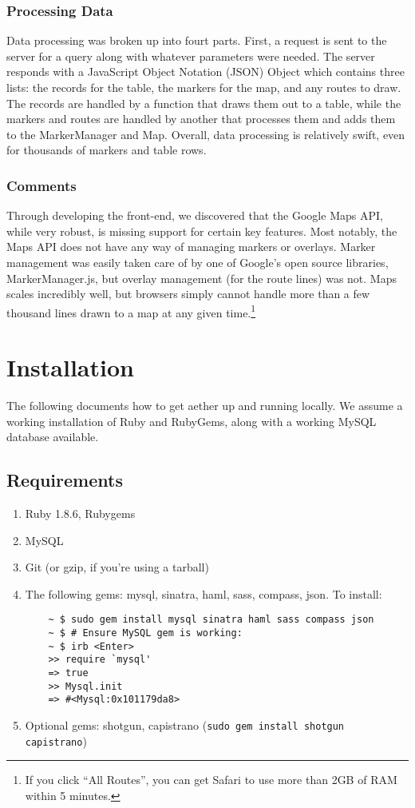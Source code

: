 \subsubsection{Processing Data}
Data processing was broken up into fourt parts. First, a request is sent to the server for a query along with whatever parameters were needed. The server responds with a JavaScript Object Notation (JSON) Object which contains three lists: the records for the table, the markers for the map, and any routes to draw. The records are handled by a function that draws them out to a table, while the markers and routes are handled by another that processes them and adds them to the MarkerManager and Map. Overall, data processing is relatively swift, even for thousands of markers and table rows.

\subsubsection{Comments}
Through developing the front-end, we discovered that the Google Maps API, while very robust, is missing support for certain key features. Most notably, the Maps API does not have any way of managing markers or overlays. Marker management was easily taken care of by one of Google's open source libraries, MarkerManager.js, but overlay management (for the route lines) was not. Maps scales incredibly well, but browsers simply cannot handle more than a few thousand lines drawn to a map at any given time.\footnote{If you click ``All Routes'', you can get Safari to use more than 2GB of RAM within 5 minutes.}

\section{Installation}
The following documents how to get aether up and running locally. We assume a working installation of Ruby and RubyGems, along with a working MySQL database available.

\subsection{Requirements}
\begin{enumerate}
  \item Ruby 1.8.6, Rubygems
  \item MySQL
  \item Git (or gzip, if you're using a tarball)
  \item The following gems: mysql, sinatra, haml, sass, compass, json. To install:
  \begin{verbatim}
    ~ $ sudo gem install mysql sinatra haml sass compass json
    ~ $ # Ensure MySQL gem is working:
    ~ $ irb <Enter>
    >> require `mysql'
    => true
    >> Mysql.init
    => #<Mysql:0x101179da8>
  \end{verbatim}
  \item Optional gems: shotgun, capistrano (\verb!sudo gem install shotgun capistrano!)
\end{enumerate}

